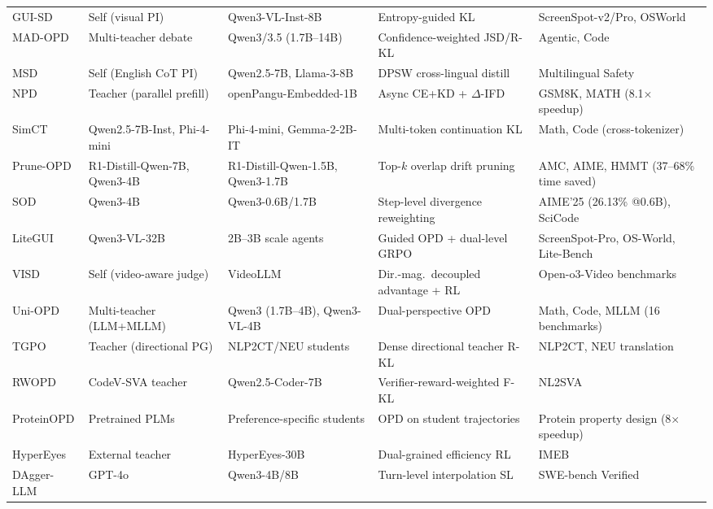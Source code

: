 \documentclass{article} %
\begin{document}
\begin{table}[t]
{\begin{tabular}{@{}lllll@{}}
        GUI-SD \citep{2605.00642} & Self (visual PI) & Qwen3-VL-Inst-8B & Entropy-guided KL & ScreenSpot-v2/Pro, OSWorld \\
        MAD-OPD \citep{2605.01347} & Multi-teacher debate & Qwen3/3.5 (1.7B--14B) & Confidence-weighted JSD/R-KL & Agentic, Code \\
        MSD \citep{2605.02971} & Self (English CoT PI) & Qwen2.5-7B, Llama-3-8B & DPSW cross-lingual distill & Multilingual Safety \\
        NPD \citep{2605.05940} & Teacher (parallel prefill) & openPangu-Embedded-1B & Async CE+KD + $\Delta$-IFD & GSM8K, MATH (8.1$\times$ speedup) \\
        SimCT \citep{2605.07711} & Qwen2.5-7B-Inst, Phi-4-mini & Phi-4-mini, Gemma-2-2B-IT & Multi-token continuation KL & Math, Code (cross-tokenizer) \\
        Prune-OPD \citep{2605.07804} & R1-Distill-Qwen-7B, Qwen3-4B & R1-Distill-Qwen-1.5B, Qwen3-1.7B & Top-$k$ overlap drift pruning & AMC, AIME, HMMT (37--68\% time saved) \\
        SOD \citep{2605.07725} & Qwen3-4B & Qwen3-0.6B/1.7B & Step-level divergence reweighting & AIME'25 (26.13\% @0.6B), SciCode \\
        LiteGUI \citep{2605.07505} & Qwen3-VL-32B & 2B--3B scale agents & Guided OPD + dual-level GRPO & ScreenSpot-Pro, OS-World, Lite-Bench \\
        VISD \citep{2605.06094} & Self (video-aware judge) & VideoLLM & Dir.-mag.\ decoupled advantage + RL & Open-o3-Video benchmarks \\
        Uni-OPD \citep{2605.03677} & Multi-teacher (LLM+MLLM) & Qwen3 (1.7B--4B), Qwen3-VL-4B & Dual-perspective OPD & Math, Code, MLLM (16 benchmarks) \\
        TGPO \citep{2605.13230} & Teacher (directional PG) & NLP2CT/NEU students & Dense directional teacher R-KL & NLP2CT, NEU translation \\
        RWOPD \citep{2605.13501} & CodeV-SVA teacher & Qwen2.5-Coder-7B & Verifier-reward-weighted F-KL & NL2SVA \\
        ProteinOPD \citep{2605.10189} & Pretrained PLMs & Preference-specific students & OPD on student trajectories & Protein property design (8$\times$ speedup) \\
        HyperEyes \citep{2605.07177} & External teacher & HyperEyes-30B & Dual-grained efficiency RL & IMEB \\
        DAgger-LLM \citep{2605.12913} & GPT-4o & Qwen3-4B/8B & Turn-level interpolation SL & SWE-bench Verified \\

\end{tabular}}
\end{table}
\end{document}
